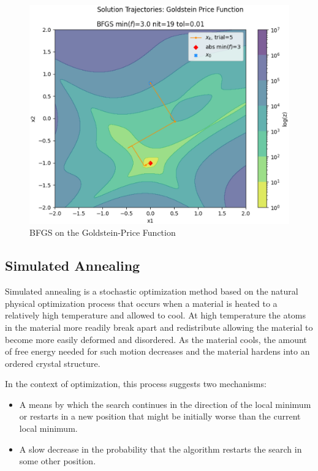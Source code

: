 \documentclass{vgtc}                          %
\begin{document}
\begin{figure}[tb]
\centering
\includegraphics[width=\columnwidth]{figures/pictures/images/bfgs-goldstein_price-plot2d-05.eps}
\caption{BFGS on the Goldstein-Price Function}
\label{fig:bfgs-goldstein_price}
\end{figure}

\subsection{Simulated Annealing}

Simulated annealing \cite{Kochenderfer:2019} is a stochastic optimization method based on the natural physical optimization process that occurs when a material is heated to a relatively high temperature and allowed to cool.  At high temperature the atoms in the material more readily break apart and redistribute allowing the material to become more easily deformed and disordered.  As the material cools, the amount of free energy needed for such motion decreases and the material hardens into an ordered crystal structure.

In the context of optimization, this process suggests two mechanisms:
\begin{itemize}
\item A means by which the search continues in the direction of the local minimum or restarts in a new position that might be initially worse than the current local minimum.
\item A slow decrease in the probability that the algorithm restarts the search in some other position.
\end{itemize}
\end{document}
